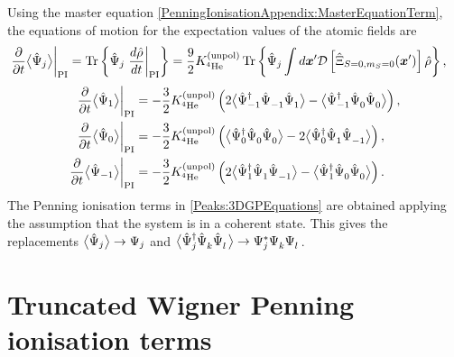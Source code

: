Using the master equation \eqref{PenningIonisationAppendix:MasterEquationTerm}, the equations of motion for the expectation values of the atomic fields are
\begin{align}
    \left.\frac{\partial}{\partial t} {\big<\hat{\Psi}_j\big>}\right|_\text{PI} &= \operatorname{Tr}\left\{\hat{\Psi}_j \left.\frac{d\hat{\rho}}{dt}\right|_\text{PI}\right\} = \frac{9}{2} K^\text{(unpol)}_{^4\text{He}} \operatorname{Tr}\left\{\hat{\Psi}_j \int d \bm{x}' \mathcal{D}\left[\hat{\Xi}_{S=0, m_S=0}(\bm{x}')\right] \hat{\rho} \right\},
\end{align}
\begin{subequations}
    \label{PenningIonisationAppendix:GPTerms}
    \begin{align}
        \left.\frac{\partial}{\partial t} \mean{\hat{\Psi}_1}\right|_\text{PI} &= -\frac{3}{2} \Kunpol \left(2\mean{\hat{\Psi}_{-1}^\dagger \hat{\Psi}_{-1}^{\phantom{\dagger}} \hat{\Psi}_1^{\phantom{\dagger}}} - \mean{\hat{\Psi}_{-1}^\dagger \hat{\Psi}_{0}^{\phantom{\dagger}} \hat{\Psi}_0^{\phantom{\dagger}}}\right), \\
        \left. \frac{\partial}{\partial t} \mean{\hat{\Psi}_0} \right|_\text{PI} &= -\frac{3}{2} \Kunpol \left(\mean{\hat{\Psi}_0^\dagger \hat{\Psi}_0^{\phantom{\dagger}} \hat{\Psi}_0^{\phantom{\dagger}}} -2\mean{\hat{\Psi}_0^\dagger \hat{\Psi}_1^{\phantom{\dagger}} \hat{\Psi}_{-1}^{\phantom{\dagger}}}\right),\\
        \left.\frac{\partial}{\partial t} \mean{\hat{\Psi}_{-1}}\right|_\text{PI} &= -\frac{3}{2} \Kunpol \left(2\mean{\hat{\Psi}_1^\dagger \hat{\Psi}_{1}^{\phantom{\dagger}} \hat{\Psi}_{-1}^{\phantom{\dagger}}} - \mean{\hat{\Psi}_1^\dagger \hat{\Psi}_0^{\phantom{\dagger}} \hat{\Psi}_0^{\phantom{\dagger}}}\right).
    \end{align}
\end{subequations}
The Penning ionisation terms in \eqref{Peaks:3DGPEquations} are obtained applying the assumption that the system is in a coherent state. This gives the replacements ${\big<\hat{\Psi}_j\big>} \rightarrow \Psi_j$ and ${\big<\hat{\Psi}_j^\dagger \hat{\Psi}_k^{\phantom{\dagger}} \hat{\Psi}_l^{\phantom{\dagger}}\big>}\rightarrow \Psi_j^* \Psi_k^{\phantom{*}} \Psi_l^{\phantom{*}}$.

\section{Truncated Wigner Penning ionisation terms}
\label{PenningIonisationAppendix:TW}

